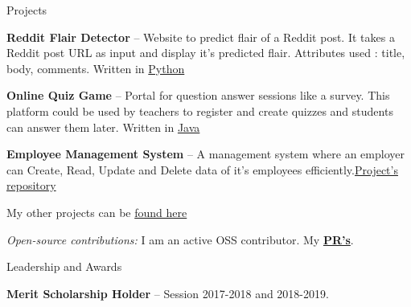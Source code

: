 \documentclass{resume} %
\begin{document}
\begin{rSection}{Projects}
  \begin{rProjectSection}
    \item \textbf {Reddit Flair Detector} -- Website to predict flair of a Reddit post. It takes a Reddit post URL as input and display it's predicted flair. Attributes used : title, body, comments. Written in \href{https://github.com/siddhi523/reddit_flair_detector_}{Python}
    \vspace{3mm}
    \item \textbf {Online Quiz Game} --  Portal for question answer sessions like a survey. This platform could be used by teachers to register and create quizzes and students can answer them later. Written in \href{https://github.com/siddhi523/Online_Quiz_Game}{Java}
    \vspace{3mm}
    \item \textbf {Employee Management System} -- A management system where an employer can Create, Read, Update and Delete data of it's employees efficiently.\href{https://www.semanticscholar.org/paper/Empirical-Analysis-of-Cervical-and-Breast-Cancer-Kaur-Pruthi/28fd7fd826460167a685b29cf3f56cfe83da1cb6}{Project's repository}
    \vspace{3mm}
    \item My other projects can be \href{https://github.com/siddhi523?tab=repositories}{found here}
  \end{rProjectSection}

  \begin{rBlurbSection}
    \item {\em Open-source contributions:}
      I am an active OSS contributor. My \href{https://github.com/pulls}{\textbf{PR's}}.
  \end{rBlurbSection}
\end{rSection}


\begin{rSection}{Leadership and Awards}
  \begin{rProjectSection}
    \item \textbf {Merit Scholarship Holder} -- Session 2017-2018 and 2018-2019.
  \end{rProjectSection}
\end{rSection}


\end{document}
